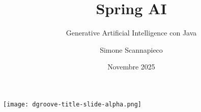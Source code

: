 \title[Spring AI base]{Spring AI}

\subtitle{Generative Artificial Intelligence con Java}


\date{Novembre 2025}

\author[S.Scannapieco]{Simone Scannapieco}

%
\begin{frame}
	\centering
	\texttt{[image: dgroove-title-slide-alpha.png]}
\end{frame}
%
\begin{frame}[fragile]
	
	\titlepage

\end{frame}